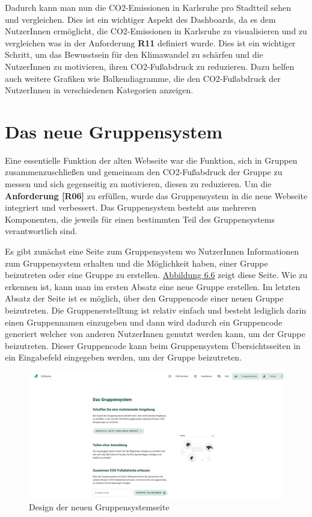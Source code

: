 Dadurch kann man nun die CO2-Emissionen in Karlsruhe pro Stadtteil sehen und vergleichen. Dies ist ein wichtiger Aspekt des Dashboards, da es dem NutzerInnen ermöglicht, die CO2-Emissionen in Karlsruhe zu visualisieren und zu vergleichen was in der Anforderung \textbf{R11} definiert wurde. Dies ist ein wichtiger Schritt, um das Bewusstsein für den Klimawandel zu schärfen und die NutzerInnen zu motivieren, ihren CO2-Fußabdruck zu reduzieren. Dazu helfen auch weitere Grafiken wie Balkendiagramme, die den CO2-Fußabdruck der NutzerInnen in verschiedenen Kategorien anzeigen.

\section{Das neue Gruppensystem}

Eine essentielle Funktion der alten Webseite war die Funktion, sich in Gruppen zusammenzuschließen und gemeinsam den CO2-Fußabdruck der Gruppe zu messen und sich gegenseitig zu motivieren, diesen zu reduzieren. Um die \textbf{Anforderung [R06]} zu erfüllen, wurde das Gruppensystem in die neue Webseite integriert und verbessert. Das Gruppensystem besteht aus mehreren Komponenten, die jeweils für einen bestimmten Teil des Gruppensystems verantwortlich sind.

Es gibt zunächst eine Seite zum Gruppensystem wo NutzerInnen Informationen zum Gruppensystem erhalten und die Möglichkeit haben, einer Gruppe beizutreten oder eine Gruppe zu erstellen.
\hyperref[fig:gruppensystem-neues-design]{Abbildung 6.6} zeigt diese Seite.
Wie zu erkennen ist, kann man im ersten Absatz eine neue Gruppe erstellen.
Im letzten Absatz der Seite ist es möglich, über den Gruppencode einer neuen Gruppe beizutreten.
Die Gruppenerstelltung ist relativ einfach und besteht lediglich darin einen Gruppennamen einzugeben und dann wird dadurch ein Gruppencode generiert welcher von anderen NutzerInnen genutzt werden kann, um der Gruppe beizutreten. Dieser Gruppencode kann beim Gruppensystem Übersichtsseiten in ein Eingabefeld eingegeben werden, um der Gruppe beizutreten.
\begin{figure}[H]
    \centering
    \includegraphics[width=1\textwidth]{images/06/gruppensystem-design.png}
    \caption{Design der neuen Gruppensystemseite}
    \label{fig:gruppensystem-neues-design}
\end{figure}

